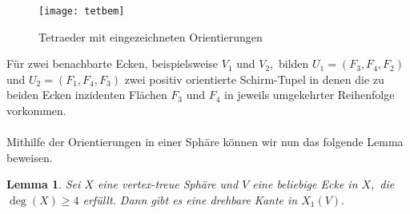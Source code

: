 \documentclass[12pt,titlepage,twoside,cleardoublepage]{article}
\theoremstyle{nummermitklammern}
\newtheorem{lemma}[temp]{Lemma}
\newtheorem{lemma}[zahl]{Lemma}
\numberwithin{equation}{section}
\begin{document}
\begin{figure}[H]
\begin{center}
\texttt{[image: tetbem]}
\end{center}
\caption{Tetraeder mit eingezeichneten Orientierungen}
\end{figure} 
Für zwei benachbarte Ecken, beispielsweise $V_1$ und $V_2,$ bilden $U_1=(F_3,F_4,F_2)$ und $U_2=(F_1,F_4,F_3)$ zwei positiv orientierte Schirm-Tupel in denen die zu beiden Ecken inzidenten Flächen $F_3$ und $F_4$ in jeweils umgekehrter Reihenfolge vorkommen.
\\\\
Mithilfe der Orientierungen in einer Sphäre können wir nun das folgende Lemma beweisen.
\begin{lemma}\label{grad3}
Sei $X$ eine vertex-treue Sphäre und $V$ eine beliebige Ecke in $X,$ die $\deg(X)\geq 4$ erfüllt. Dann gibt es eine drehbare Kante in $X_1(V).$ 
\end{lemma}
\end{document}
